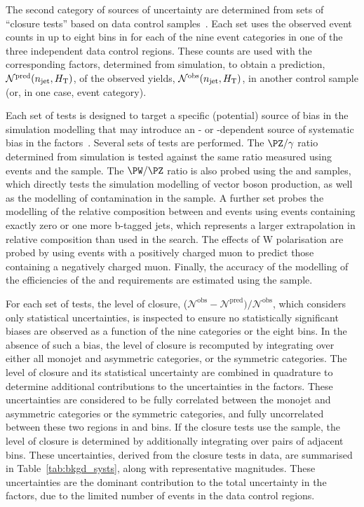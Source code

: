 The second category of sources of uncertainty are determined from sets
of ``closure tests'' based on data control
samples~\cite{RA1Paper2012}. Each set uses the observed event counts
in up to eight bins in \scalht for each of the nine \njet event
categories in one of the three independent data control regions. These
counts are used with the corresponding \tf factors, determined from
simulation, to obtain a prediction, $\mathcal{N}^\text{pred}(\njet,
\scalht)$, of the observed yields, $\mathcal{N}^\text{obs}(\njet,
\scalht)$, in another control sample (or, in one case, \nb event
category).

Each set of tests is designed to target a specific (potential) source
of bias in the simulation modelling that may introduce an \njet- or
\scalht-dependent source of systematic bias in the \tf
factors~\cite{RA1Paper2012}. Several sets of tests are performed. The
$\PZ/\gamma$ ratio determined from simulation is tested against the
same ratio measured using \zmumuj events and the \gj sample.
The $\PW/\PZ$ ratio is also probed using the \mj and \mmj
samples, which directly tests the simulation modelling of vector
boson production, as well as the modelling of \ttbar contamination in
the \mj sample. 
A further set probes the modelling of the relative composition between
\wlj and \ttbar events using \mj events containing exactly zero or one
more b-tagged jets, which represents a larger extrapolation in
relative composition than used in the search.  The effects of W
polarisation are probed by using \mj events with a positively charged
muon to predict those containing a negatively charged muon. Finally,
the accuracy of the modelling of the efficiencies of the \alphat and
\bdphi requirements are estimated using the \mj sample.

For each set of tests, the level of closure, %
($\mathcal{N}^\text{obs} - \mathcal{N}^\text{pred}) /
\mathcal{N}^\text{obs}$, which considers only statistical
uncertainties, is inspected to ensure no statistically significant
biases are observed as a function of the nine \njet categories or the
eight \scalht bins. In the absence of such a bias, the level of
closure is recomputed by integrating over either all monojet and
asymmetric \njet categories, or the symmetric \njet categories. The
level of closure and its statistical uncertainty are combined in
quadrature to determine additional contributions to the uncertainties
in the \tf factors. These uncertainties are considered to be
fully correlated between the monojet and asymmetric \njet categories
or the symmetric \njet categories, and fully uncorrelated between
these two regions in \njet and \scalht bins. If the closure tests use
the \mmj sample, the level of closure is determined by additionally
integrating over pairs of adjacent \scalht bins. These uncertainties,
derived from the closure tests in data, are summarised in
Table~\ref{tab:bkgd_systs}, along with representative
magnitudes. These uncertainties are the dominant contribution to the
total uncertainty in the \tf factors, due to the limited number
of events in the data control regions.

